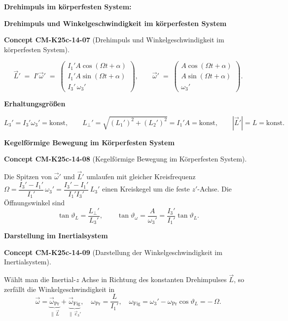 \documentclass[10pt, letterpaper]{article}
\newcommand{\CustomHeading}[3]{%
  \par\medskip\noindent%
  \textbf{#1 #2} \textnormal{(#3)}.\enskip%
}
\newenvironment{CONC}[2]{\begin{unitbox}\CustomHeading{Concept}{#1}{#2}}{\end{unitbox}}
\begin{document}
\textbf{Drehimpuls im körperfesten System:}

\textbf{Drehimpuls und Winkelgeschwindigkeit im körperfesten System}

\begin{CONC}{CM-K25c-14-07}{Drehimpuls und Winkelgeschwindigkeit im körperfesten System}
\[
\vec L' \;=\; I'\vec\omega'
           \;=\;
           \begin{pmatrix}
             I_1' A\cos(\Omega t+\alpha)\\
             I_1' A\sin(\Omega t+\alpha)\\
             I_3'\,\omega_3'
           \end{pmatrix},
\qquad
\vec\omega'
           \;=\;
           \begin{pmatrix}
             A\cos(\Omega t+\alpha)\\
             A\sin(\Omega t+\alpha)\\
             \omega_3'
           \end{pmatrix}.
\]

\textbf{Erhaltungsgrößen}

\[
L_3' = I_3'\omega_3' = \text{konst},
\qquad
L_\perp' = \sqrt{(L_1')^{2}+(L_2')^{2}} = I_1' A = \text{konst},
\qquad
|\vec L'| = L = \text{konst}.
\]
\end{CONC}

\textbf{Kegelförmige Bewegung im Körperfesten System}

\begin{CONC}{CM-K25c-14-08}{Kegelförmige Bewegung im Körperfesten System}
Die Spitzen von $\vec\omega'$ und $\vec L'$ umlaufen mit gleicher Kreisfrequenz
\(
  \Omega = \dfrac{I_3'-I_1'}{I_1'}\,\omega_3'
         = \dfrac{I_3'-I_1'}{I_1'I_3'}\,L_3'
\)
einen Kreiskegel um die feste $z'$-Achse.
Die Öffnungswinkel sind
\[
\tan\vartheta_L=\frac{L_\perp'}{L_3'}, 
\qquad
\tan\vartheta_\omega=\frac{A}{\omega_3'}
                    =\frac{I_3'}{I_1'}\tan\vartheta_L .
\]
\end{CONC}

\textbf{Darstellung im Inertialsystem}

\begin{CONC}{CM-K25c-14-09}{Darstellung der Winkelgeschwindigkeit im Inertialsystem}
Wählt man die Inertial-$z$ Achse in Richtung des konstanten
Drehimpulses $\vec L$, so zerfällt die Winkelgeschwindigkeit in
\[
\vec\omega = \underbrace{\vec\omega_{\!\text{Pr}}}_{\parallel\,\vec L}
             +\underbrace{\vec\omega_{\!\text{Fig}}}_{\parallel\,\vec e_3'},
\quad
\omega_{\!\text{Pr}}=\frac{L}{I_1'},
\quad
\omega_{\!\text{Fig}}=\omega_3' - \omega_{\!\text{Pr}}\cos\vartheta_L
                    = -\,\Omega .
\]
\end{CONC}
\end{document}
